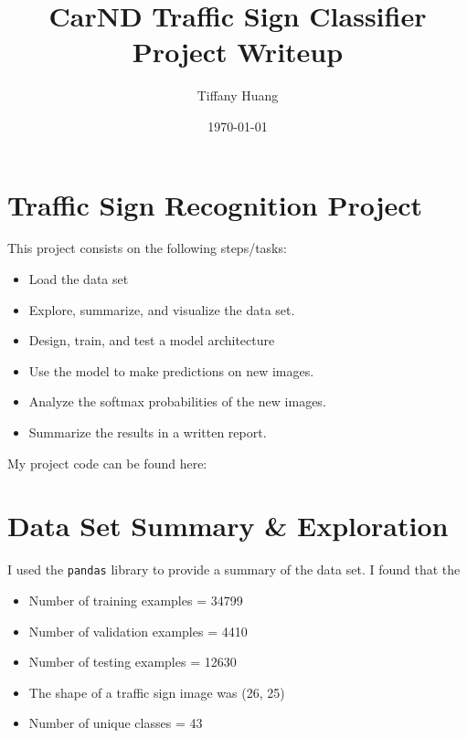 \documentclass[12pt]{article}
\title{CarND Traffic Sign Classifier Project Writeup}
\author{Tiffany Huang}
\date{\today}
\begin{document}
\maketitle


\section{Traffic Sign Recognition Project}
This project consists on the following steps/tasks:
\begin{itemize}
\item{Load the data set}
\item {Explore, summarize, and visualize the data set.}
\item {Design, train, and test a model architecture}
\item {Use the model to make predictions on new images.}
\item {Analyze the softmax probabilities of the new images.}
\item {Summarize the results in a written report.}
\end{itemize}
My project code can be found here:

\section{Data Set Summary \& Exploration}
I used the \texttt{pandas} library to provide a summary of the data set. I found that the
\begin{itemize}
\item {Number of training examples = 34799}
\item {Number of validation examples = 4410}
\item {Number of testing examples = 12630}
\item {The shape of a traffic sign image was (26, 25)}
\item {Number of unique classes = 43}
\end{itemize}
\end{document}
